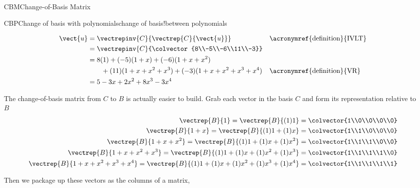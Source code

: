 \begin{subsect}{CBM}{Change-of-Basis Matrix}
\begin{example}{CBP}{Change of basis with polynomials}{change of basis!between polynomials}
\begin{para}
%
\begin{align*}
\vect{u}
%
&=\vectrepinv{C}{\vectrep{C}{\vect{u}}}
&&\text{\acronymref{definition}{IVLT}}\\
%
&=\vectrepinv{C}{\colvector{8\\-5\\-6\\11\\-3}}\\
%
&=8(1)+(-5)(1+x)+(-6)(1+x+x^2)\\
&\quad\quad+(11)(1+x+x^2+x^3)+(-3)(1+x+x^2+x^3+x^4)
&&\text{\acronymref{definition}{VR}}\\
%
&=5-3x+2x^2+8x^3-3x^4
%
\end{align*}
\end{para}
%
\begin{para}The change-of-basis matrix from $C$ to $B$ is actually easier to build.  Grab each vector in the basis $C$ and form its representation relative to $B$
%
\begin{align*}
\vectrep{B}{1}
=\vectrep{B}{(1)1}
&=\colvector{1\\0\\0\\0\\0}\\
%
\vectrep{B}{1+x}
=\vectrep{B}{(1)1+(1)x}
&=\colvector{1\\1\\0\\0\\0}\\
%
\vectrep{B}{1+x+x^2}
=\vectrep{B}{(1)1+(1)x+(1)x^2}
&=\colvector{1\\1\\1\\0\\0}\\
%
\vectrep{B}{1+x+x^2+x^3}
=\vectrep{B}{(1)1+(1)x+(1)x^2+(1)x^3}
&=\colvector{1\\1\\1\\1\\0}\\
%
\vectrep{B}{1+x+x^2+x^3+x^4}
=\vectrep{B}{(1)1+(1)x+(1)x^2+(1)x^3+(1)x^4}
&=\colvector{1\\1\\1\\1\\1}\\
%
\end{align*}
\end{para}
%
\begin{para}Then we package up these vectors as the columns of a matrix,

\end{para}
\end{example}
\end{subsect}
